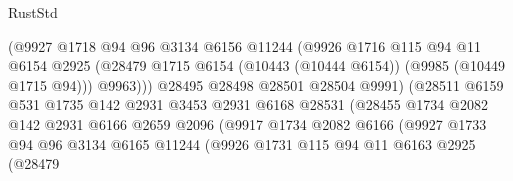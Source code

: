 \begin{lexlean}{RustStd}
\begin{coremodule}
                                  (@9927
                                    @1718
                                    @94
                                    @96
                                    @3134
                                    @6156
                                    @11244
                                    (@9926
                                      @1716
                                      @115
                                      @94
                                      @11
                                      @6154
                                      @2925
                                      (@28479
                                        @1715
                                        @6154
                                        (@10443 (@10444 @6154))
                                        (@9985 (@10449 @1715 @94)))
                                      @9963)))
                                @28495
                                @28498
                                @28501
                                @28504
                                @9991)
                              (@28511
                                @6159
                                @531
                                @1735
                                @142
                                @2931
                                @3453
                                @2931
                                @6168
                                @28531
                                (@28455
                                  @1734
                                  @2082
                                  @142
                                  @2931
                                  @6166
                                  @2659
                                  @2096
                                  (@9917
                                    @1734
                                    @2082
                                    @6166
                                    (@9927
                                      @1733
                                      @94
                                      @96
                                      @3134
                                      @6165
                                      @11244
                                      (@9926
                                        @1731
                                        @115
                                        @94
                                        @11
                                        @6163
                                        @2925
                                        (@28479

\end{coremodule}
\end{lexlean}
